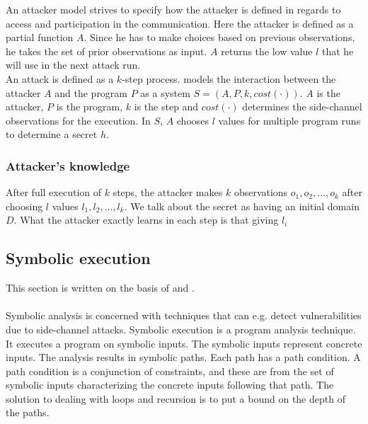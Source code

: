 \documentclass[11pt,a4paper,notitlepage]{article}
\begin{document}
An attacker model strives to specify how the attacker is defined in regards to access and participation in the communication. Here the attacker is defined as a partial function $A$. Since he has to make choices based on previous observations, he takes the set of prior observations as input. $A$ returns the low value $l$ that he will use in the next attack run. 
\\An attack is defined as a $k$-step process. \cite{phan2017synthesis} models the interaction between the attacker $A$ and the program $P$ as a system $S = (A,P,k,cost(\cdot))$. $A$ is the attacker, $P$ is the program, $k$ is the step and $cost(\cdot)$ determines the side-channel observations for the execution. In $S$, $A$ chooses $l$ values for multiple program runs to determine a secret $h$. 

\subsubsection{Attacker's knowledge}

After full execution of $k$ steps, the attacker makes $k$ observations $o_1,o_2,...,o_k$ after choosing $l$ values $l_1,l_2,...,l_k$. We talk about the secret as having an initial domain $D$. What the attacker exactly learns in each step is that giving $l_i$ 

\subsection{Symbolic execution}
\label{sec:symbolicexecution}
This section is written on the basis of \cite{phan2017synthesis} and \cite{malacaria2018symbolic}.
\\\\
Symbolic analysis is concerned with techniques that can e.g. detect vulnerabilities due to side-channel attacks. Symbolic execution is a program analysis technique. It executes a program on symbolic inputs. The symbolic inputs represent concrete inputs. The analysis results in symbolic paths. Each path has a path condition. A path condition is a conjunction of constraints, and these are from the set of symbolic inputs characterizing the concrete inputs following that path. The solution to dealing with loops and recursion is to put a bound on the depth of the paths.  
\end{document}
